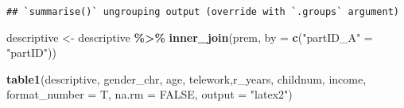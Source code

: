 \documentclass[
]{article}
\newenvironment{Shaded}{\begin{snugshade}}{\end{snugshade}}
\newcommand{\DataTypeTok}[1]{\textcolor[rgb]{0.13,0.29,0.53}{#1}}
\newcommand{\KeywordTok}[1]{\textcolor[rgb]{0.13,0.29,0.53}{\textbf{#1}}}
\newcommand{\NormalTok}[1]{#1}
\newcommand{\OperatorTok}[1]{\textcolor[rgb]{0.81,0.36,0.00}{\textbf{#1}}}
\newcommand{\OtherTok}[1]{\textcolor[rgb]{0.56,0.35,0.01}{#1}}
\newcommand{\StringTok}[1]{\textcolor[rgb]{0.31,0.60,0.02}{#1}}
\begin{document}
\begin{verbatim}
## `summarise()` ungrouping output (override with `.groups` argument)
\end{verbatim}

\begin{Shaded}
\begin{Highlighting}[]
\NormalTok{descriptive \textless{}{-}}\StringTok{ }\NormalTok{descriptive }\OperatorTok{\%\textgreater{}\%}
\StringTok{  }\KeywordTok{inner\_join}\NormalTok{(prem, }\DataTypeTok{by =} \KeywordTok{c}\NormalTok{(}\StringTok{"partID\_A"}\NormalTok{ =}\StringTok{ "partID"}\NormalTok{))}
\end{Highlighting}
\end{Shaded}

\begin{Shaded}
\begin{Highlighting}[]
\KeywordTok{table1}\NormalTok{(descriptive, gender\_chr, age, telework,r\_years, childnum, income, }\DataTypeTok{format\_number =}\NormalTok{ T, }\DataTypeTok{na.rm =} \OtherTok{FALSE}\NormalTok{, }\DataTypeTok{output =} \StringTok{"latex2"}\NormalTok{)}
\end{Highlighting}
\end{Shaded}
\end{document}
